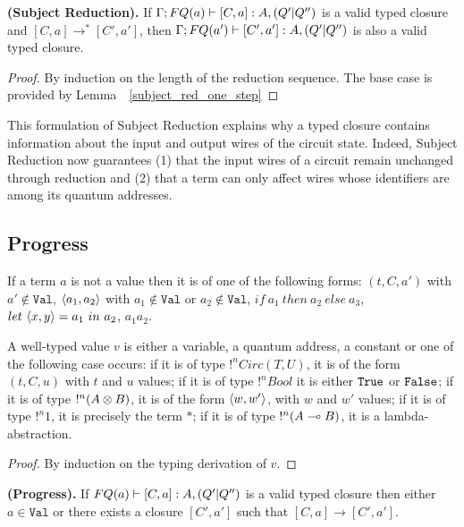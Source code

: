 \documentclass{article}
\begin{document}
\begin{corollary}
{\bf (Subject Reduction).}
If $\Gamma;FQ(a)\vdash [C,a]:A,(Q'|Q'')$ is a valid typed closure 
and $[C,a]\to^* [C',a']$, then $\Gamma;FQ(a')\vdash [C',a']:A,(Q'|Q'')$ 
is also a valid typed closure.
\end{corollary}

\begin{proof}
By induction on the length of the reduction sequence. The base case is 
provided by Lemma~~\hyperref[subject_red_one_step]{\ref*{subject_red_one_step}}
\end{proof}

This formulation of Subject Reduction explains why a typed closure contains 
information about the input and output wires of the circuit state. Indeed, 
Subject Reduction now guarantees (1) that the input wires of a circuit 
remain unchanged through reduction and (2) that a term can only affect 
wires whose identifiers are among its quantum addresses.

\subsection{Progress}

\begin{lemma}
\label{non_values}
If a term $a$ is not a value then it is of one 
of the following forms: $(t,C,a')$ with $a'\notin \mathtt{Val}$, 
$\langle a_1,a_2\rangle$ with $a_1\notin \mathtt{Val}$ or $a_2\notin \mathtt{Val}$, 
$if ~a_1~ then ~a_2~ else ~a_3$, $let ~\langle x,y\rangle=a_1~ in ~a_2$, $a_1a_2$.
\end{lemma}

\begin{lemma}
\label{form_values}
A well-typed value $v$ is either a variable, a quantum address, a constant or one 
of the following case occurs: if it is of type $!^nCirc(T,U)$, it is of the 
form $(t,C,u)$ with $t$ and $u$ values; if it is of type $!^nBool$ it is either 
$\texttt{True}$ or $\texttt{False}$; if it is of type $!^n (A\otimes B)$, it is of the
form $\langle w,w'\rangle$, with $w$ and $w'$ values; if it is of type $!^n1$, it is 
precisely the term $*$; if it is of type $!^n (A\multimap B)$, it is a 
lambda-abstraction.
\end{lemma}

\begin{proof}
By induction on the typing derivation of $v$.
\end{proof}

\begin{proposition}
{\bf (Progress).}
If $FQ(a)\vdash [C,a]:A,(Q'|Q'')$ is a valid typed closure then either 
$a\in\mathtt{Val}$ or there exists a closure $[C',a']$ such that 
$[C,a]\to [C',a']$.
\end{proposition}
\end{document}
